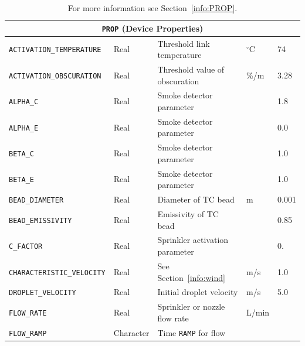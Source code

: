 \documentclass[11pt]{book}
\newcommand{\ct}{\tt\small}
\begin{document}
\begin{table}[H]
\caption{For more information see Section~\ref{info:PROP}.}\label{tbl:PROP}
\noindent
\begin{tabular*}{\textwidth}{@{\extracolsep{\fill}}|l|l|l|l|l|}
\hline
\multicolumn{5}{|c|}{{\ct PROP} (Device Properties)} \\ \hline \hline
{\ct ACTIVATION\_TEMPERATURE}           & Real          & Threshold link temperature       & $^\circ$C             & 74        \\ \hline
{\ct ACTIVATION\_OBSCURATION}           & Real          & Threshold value of obscuration   & \%/m                  & 3.28      \\ \hline
{\ct ALPHA\_C}                          & Real          & Smoke detector parameter         &                       & 1.8       \\ \hline
{\ct ALPHA\_E}                          & Real          & Smoke detector parameter         &                       & 0.0       \\ \hline
{\ct BETA\_C}                           & Real          & Smoke detector parameter         &                       & 1.0       \\ \hline
{\ct BETA\_E}                           & Real          & Smoke detector parameter         &                       & 1.0       \\ \hline
{\ct BEAD\_DIAMETER}                    & Real          & Diameter of TC bead              & m                     & 0.001     \\ \hline
{\ct BEAD\_EMISSIVITY}                  & Real          & Emissivity of TC bead            &                       & 0.85      \\ \hline
{\ct C\_FACTOR}                         & Real          & Sprinkler activation parameter   &                       & 0.        \\ \hline
{\ct CHARACTERISTIC\_VELOCITY}          & Real          & See Section~\ref{info:wind}      & m/s                   & 1.0       \\ \hline
{\ct DROPLET\_VELOCITY}                 & Real          & Initial droplet velocity         & m/s                   & 5.0       \\ \hline
{\ct FLOW\_RATE}                        & Real          & Sprinkler or nozzle flow rate    & L/min                 &           \\ \hline
{\ct FLOW\_RAMP}                        & Character     & Time {\ct RAMP} for flow         &                       &           \\ \hline

\end{tabular*}
\end{table}
\end{document}
